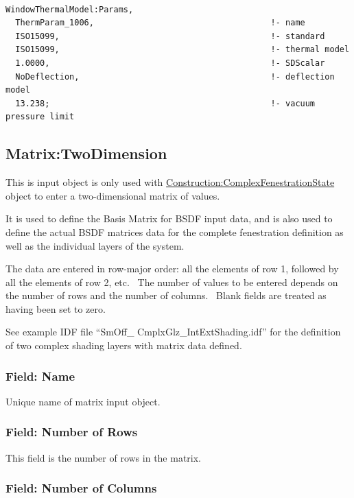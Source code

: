 \begin{lstlisting}

WindowThermalModel:Params,
  ThermParam_1006,                                    !- name
  ISO15099,                                           !- standard
  ISO15099,                                           !- thermal model
  1.0000,                                             !- SDScalar
  NoDeflection,                                       !- deflection model
  13.238;                                             !- vacuum pressure limit
\end{lstlisting}

\subsection{Matrix:TwoDimension}\label{matrixtwodimension}

This is input object is only used with \hyperref[constructioncomplexfenestrationstate]{Construction:ComplexFenestrationState} object to enter a two-dimensional matrix of values.

It is used to define the Basis Matrix for BSDF input data, and is also used to define the actual BSDF matrices data for the complete fenestration definition as well as the individual layers of the system.

The data are entered in row-major order: all the elements of row 1, followed by all the elements of row 2, etc.~ The number of values to be entered depends on the number of rows and the number of columns.~ Blank fields are treated as having been set to zero.

See example IDF file ``SmOff\_ CmplxGlz\_IntExtShading.idf'' for the definition of two complex shading layers with matrix data defined.

\subsubsection{Field: Name}\label{field-name-34-000}

Unique name of matrix input object.

\subsubsection{Field: Number of Rows}\label{field-number-of-rows}

This field is the number of rows in the matrix.

\subsubsection{Field: Number of Columns}\label{field-number-of-columns}

